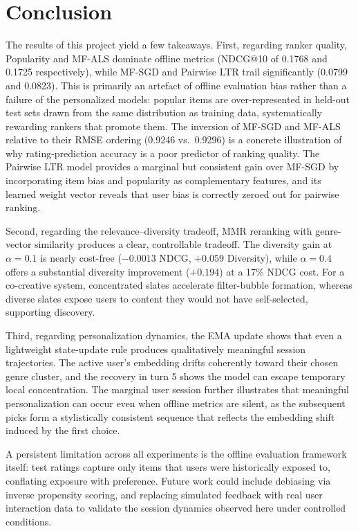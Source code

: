 \documentclass[11pt]{article}
\begin{document}
\section{Conclusion}
\label{sec:conclusion}

\noindent The results of this project yield a few takeaways. First, regarding ranker quality, Popularity and MF-ALS dominate offline metrics (NDCG@10 of 0.1768 and 0.1725 respectively), while MF-SGD and Pairwise LTR trail significantly (0.0799 and 0.0823). This is primarily an artefact of offline evaluation bias rather than a failure of the personalized models: popular items are over-represented in held-out test sets drawn from the same distribution as training data, systematically rewarding rankers that promote them. The inversion of MF-SGD and MF-ALS relative to their RMSE ordering (0.9246 vs.\ 0.9296) is a concrete illustration of why rating-prediction accuracy is a poor predictor of ranking quality. The Pairwise LTR model provides a marginal but consistent gain over MF-SGD by incorporating item bias and popularity as complementary features, and its learned weight vector reveals that user bias is correctly zeroed out for pairwise ranking.

\noindent Second, regarding the relevance--diversity tradeoff, MMR reranking with genre-vector similarity produces a clear, controllable tradeoff. The diversity gain at $\alpha = 0.1$ is nearly cost-free ($-0.0013$ NDCG, $+0.059$ Diversity), while $\alpha = 0.4$ offers a substantial diversity improvement ($+0.194$) at a 17\% NDCG cost. For a co-creative system, concentrated slates accelerate filter-bubble formation, whereas diverse slates expose users to content they would not have self-selected, supporting discovery.

\noindent Third, regarding personalization dynamics, the EMA update shows that even a lightweight state-update rule produces qualitatively meaningful session trajectories. The active user's embedding drifts coherently toward their chosen genre cluster, and the recovery in turn 5 shows the model can escape temporary local concentration. The marginal user session further illustrates that meaningful personalization can occur even when offline metrics are silent, as the subsequent picks form a stylistically consistent sequence that reflects the embedding shift induced by the first choice.

\noindent A persistent limitation across all experiments is the offline evaluation framework itself: test ratings capture only items that users were historically exposed to, conflating exposure with preference. Future work could include debiasing via inverse propensity scoring, and replacing simulated feedback with real user interaction data to validate the session dynamics observed here under controlled conditions.
\end{document}
